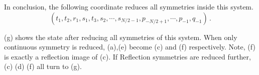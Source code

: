 In conclusion, the following coordinate reduces all symmetries inside
this system.
\begin{equation}
  \label{eq:Finalssp}
  (t_1, t_2, r_1, s_1, t_3, s_2, \cdots, s_{N/2-1}, p_{-N/2+1}, \cdots, p_{-1}, q_{-1})
  \,.
\end{equation}

 (g) shows the state after reducing all symmetries of
this system. When only continuous symmetry is reduced, (a),(e) become (c) and (f) respectively.
Note, (f) is exactly a reflection image of (c). If Reflection symmetries are reduced
further, (c) (d) (f) all turn to (g).
